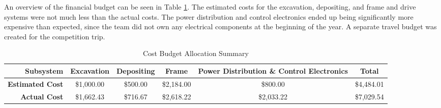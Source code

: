 \documentclass[class=article, crop=false]{standalone}
\begin{document}
	An overview of the financial budget can be seen in Table \ref{table:cost_budget}. The estimated costs for the excavation, depositing, and frame and drive systems were not much less than the actual costs. The power distribution and control electronics ended up being significantly more expensive than expected, since the team did not own any electrical components at the beginning of the year. A separate travel budget was created for the competition trip. 
	
	\FloatBarrier
	\begin{table}[h]
	\scriptsize
	\centering
	\begin{tabular}{ | r | c | c | c | c | c | }
 	\hline		
 	\rowcolor[gray]{0.8}
 		\textbf{Subsystem} & \textbf{Excavation} & \textbf{Depositing} & \textbf{Frame} & \textbf{Power Distribution \& Control Electronics} & \textbf{Total} \\
 		\hline\hline
 		\textbf{Estimated Cost} & \$1,000.00 & \$500.00 & \$2,184.00 & \$800.00 &  \$4,484.01 \\
	\hline
		\textbf{Actual Cost} & \$1,662.43 & \$716.67 & \$2,618.22 & \$2,033.22 & \$7,029.54 \\
	\hline
	\end{tabular}
	\caption{Cost Budget Allocation Summary}
		\label{table:cost_budget}
	\end{table}
	\FloatBarrier
\end{document}
